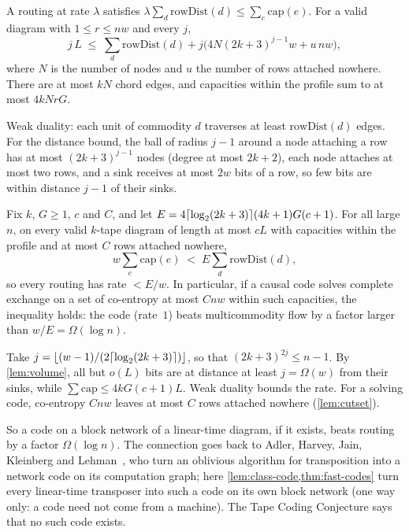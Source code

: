 \begin{lemma}\label{lem:volume}
A routing at rate $\lambda$ satisfies $\lambda\sum_d\mathrm{rowDist}(d)\le\sum_e\mathrm{cap}(e)$. For a
valid diagram with $1\le r\le nw$ and every $j$,
\[
  j\,L\;\le\;\sum_d\mathrm{rowDist}(d)+j\bigl(4N(2k+3)^{j-1}w+u\,nw\bigr),
\]
where $N$ is the number of nodes and $u$ the number of rows attached nowhere. There are at most $kN$
chord edges, and capacities within the profile sum to at most $4kNrG$.
\end{lemma}

\begin{outline}
Weak duality: each unit of commodity $d$ traverses at least $\mathrm{rowDist}(d)$ edges. For the
distance bound, the ball of radius $j-1$ around a node attaching a row has at most $(2k+3)^{j-1}$ nodes
(degree at most $2k+2$), each node attaches at most two rows, and a sink receives at most $2w$ bits of a
row, so few bits are within distance $j-1$ of their sinks.
\end{outline}

\begin{theorem}\label{thm:code-gap}
Fix $k$, $G\ge1$, $c$ and $C$, and let $E=4\lceil \log_2 (2k+3) \rceil(4k+1)G(c+1)$. For all large $n$, on every valid
$k$-tape diagram of length at most $cL$ with capacities within the profile and at most $C$ rows
attached nowhere,
\[
  w\sum_e\mathrm{cap}(e)\;<\;E\sum_d\mathrm{rowDist}(d),
\]
so every routing has rate $<E/w$. In particular, if a causal code solves complete exchange on a set of
co-entropy at most $Cnw$ within such capacities, the inequality holds: the code (rate~$1$) beats
multicommodity flow by a factor larger than $w/E=\Omega(\log n)$.
\end{theorem}

\begin{outline}
Take $j=\lfloor(w-1)/(2\lceil \log_2 (2k+3) \rceil)\rfloor$, so that $(2k+3)^{2j}\le n-1$. By \cref{lem:volume}, all
but $o(L)$ bits are at distance at least $j=\Omega(w)$ from their sinks, while
$\sum\mathrm{cap}\le4kG(c+1)L$. Weak duality bounds the rate. For a solving code, co-entropy $Cnw$
leaves at most $C$ rows attached nowhere (\cref{lem:cutset}).
\end{outline}

So a code on a block network of a linear-time diagram, if it exists, beats routing by a factor
$\Omega(\log n)$. The connection goes back to Adler, Harvey, Jain, Kleinberg and
Lehman~\cite[Thm.~6.2]{AHJKL2006}, who turn an oblivious algorithm for transposition into a network code on
its computation graph; here \cref{lem:class-code,thm:fast-codes} turn every linear-time transposer into such a
code on its own block network (one way only: a code need not come from a machine). The Tape Coding
Conjecture says that no such code exists.

